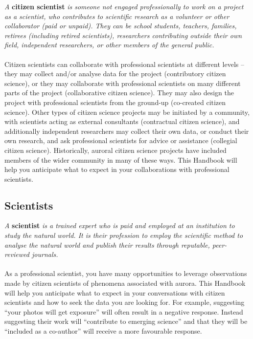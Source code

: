 \documentclass{article}
\begin{document}
\textit{A} \textbf{citizen scientist} \textit{is someone not engaged professionally to work on a project as a scientist, who contributes to scientific research as a volunteer or other collaborator (paid or unpaid). They can be school students, teachers, families, retirees (including retired scientists), researchers contributing outside their own field, independent researchers, or other members of the general public.}\\
\\
Citizen scientists can collaborate with professional scientists at different levels -- they may collect and/or analyse data for the project (contributory citizen science), or they may collaborate with professional scientists on many different parts of the project (collaborative citizen science). They may also design the project with professional scientists from the ground-up (co-created citizen science). Other types of citizen science projects may be initiated by a community, with scientists acting as external consultants (contractual citizen science), and additionally independent researchers may collect their own data, or conduct their own research, and ask professional scientists for advice or assistance (collegial citizen science). Historically, auroral citizen science projects have included members of the wider community in many of these ways. This Handbook will help you anticipate what to expect in your collaborations with professional scientists.

\subsection{Scientists}

\textit{A} \textbf{scientist} \textit{is a trained expert who is paid and employed at an institution to study the natural world. It is their profession to employ the scientific method to analyse the natural world and publish their results through reputable, peer-reviewed journals.}\\
\\
As a professional scientist, you have many opportunities to leverage observations made by citizen scientists of phenomena associated with aurora. This Handbook will help you anticipate what to expect in your conversations with citizen scientists and how to seek the data you are looking for. For example, suggesting ``your photos will get exposure'' will often result in a negative response. Instead suggesting their work will ``contribute to emerging science'' and that they will be ``included as a co-author'' will receive a more favourable response.
\end{document}
